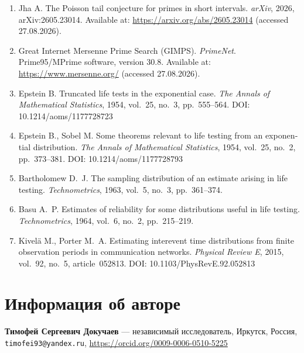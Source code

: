 \documentclass[11pt,a4paper]{article}
\theoremstyle{plain}
\theoremstyle{remark}
\begin{document}
\begin{otherlanguage}{english}
\begin{enumerate}
\item Jha A. The Poisson tail conjecture for primes in short intervals.
\emph{arXiv}, 2026, arXiv:2605.23014. Available at:
\url{https://arxiv.org/abs/2605.23014} (accessed 27.08.2026).

\item Great Internet Mersenne Prime Search (GIMPS). \emph{PrimeNet}.
Prime95/MPrime software, version 30.8. Available at:
\url{https://www.mersenne.org/} (accessed 27.08.2026).

\item Epstein B. Truncated life tests in the exponential case.
\emph{The Annals of Mathematical Statistics}, 1954, vol.~25, no.~3,
pp.~555--564. DOI: 10.1214/aoms/1177728723

\item Epstein B., Sobel M. Some theorems relevant to life testing from an
exponential distribution. \emph{The Annals of Mathematical Statistics}, 1954,
vol.~25, no.~2, pp.~373--381. DOI: 10.1214/aoms/1177728793

\item Bartholomew D.~J. The sampling distribution of an estimate arising in
life testing. \emph{Technometrics}, 1963, vol.~5, no.~3, pp.~361--374.

\item Basu A.~P. Estimates of reliability for some distributions useful in
life testing. \emph{Technometrics}, 1964, vol.~6, no.~2, pp.~215--219.

\item Kivel\"{a} M., Porter M.~A. Estimating interevent time distributions
from finite observation periods in communication networks.
\emph{Physical Review E}, 2015, vol.~92, no.~5, article~052813.
DOI: 10.1103/PhysRevE.92.052813
\end{enumerate}
\end{otherlanguage}

\section*{Информация об авторе}
\noindent\textbf{Тимофей Сергеевич Докучаев} ---
независимый исследователь, Иркутск, Россия,\\
\texttt{timofei93@yandex.ru}, \url{https://orcid.org/0009-0006-0510-5225}
\end{document}
